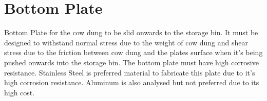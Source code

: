 \section{Bottom Plate} \label{Bottom Plate 1}
Bottom Plate for the cow dung to be slid onwards to the storage bin. It must be designed to withstand normal stress due to the weight of cow dung and shear stress due to the friction between cow dung and the plates surface when it's being pushed onwards into the storage bin. The bottom plate must have high corrosive resistance. Stainless Steel is preferred material to fabricate this plate due to it's high corrosion resistance. Aluminum is also analysed but not preferred due to its high cost.


\begin{table}[!ht]
\caption{Stress and Displacement analysis of Bottom Plate}
\end{table}

